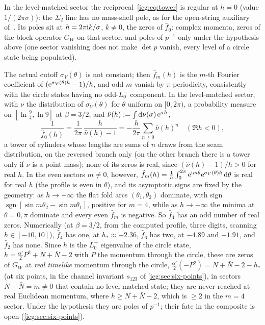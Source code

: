 In the level-matched sector the reciprocal~\eqref{icg:eq:tower} is regular at $h = 0$ (value $1/(2\pi\sigma)$): the $\Sigma_2$ line has no mass-shell pole, as for the open-string auxiliary of~\cite{ErbinFirat2023}.
Its poles sit at $h = 2\pi \mathrm{i} k / \sigma$, $k \neq 0$, the zeros of $\hat f_0$: complex momenta, zeros of the block operator $G_W$ on that sector, and poles of $p^{-1}$ only under the hypothesis above (one sector vanishing does not make $\det p$ vanish, every level of a circle state being populated).

The actual cutoff $\sigma_V(\theta)$ is not constant; then $\hat f_m(h)$ is the $m$-th Fourier coefficient of $(\mathrm{e}^{\sigma_V(\theta) h} - 1)/h$, and odd $m$ vanish by $\pi$-periodicity, consistently with the circle states having no odd-$L_0^-$ component.
In the level-matched sector, with $\nu$ the distribution of $\sigma_V(\theta)$ for $\theta$ uniform on $[0, 2\pi)$, a probability measure on $[\ln\tfrac94, \ln 9]$ at $\beta = 3/2$, and $\hat\nu(h) := \int \mathrm{d}\nu(\sigma) \, \mathrm{e}^{\sigma h}$,
\begin{equation}
  \label{icg:eq:tower-sigmaV}
  \frac{1}{\hat f_0(h)}
    = \frac{1}{2\pi} \, \frac{h}{\hat\nu(h) - 1}
    = - \frac{h}{2\pi} \sum_{n \ge 0} \hat\nu(h)^n
  \quad (\Re h < 0),
\end{equation}
a tower of cylinders whose lengths are sums of $n$ draws from the seam distribution, on the reversed branch only (on the other branch there is a tower only if $\nu$ is a point mass); none of its zeros is real, since $(\hat\nu(h) - 1)/h > 0$ for real $h$.
In the even sectors $m \neq 0$, however, $\hat f_m(h) = \frac1h \int_0^{2\pi} \mathrm{e}^{\mathrm{i} m\theta} \mathrm{e}^{\sigma_V(\theta) h} \, \mathrm{d}\theta$ is real for real $h$ (the profile is even in $\theta$), and its asymptotic signs are fixed by the geometry: as $h \to +\infty$ the flat fold arcs $(\theta_1, \theta_2)$ dominate, with sign $\operatorname{sgn}[\sin m\theta_2 - \sin m\theta_1]$, positive for $m = 4$, while as $h \to -\infty$ the minima at $\theta = 0, \pi$ dominate and every even $\hat f_m$ is negative.
So $\hat f_4$ has an odd number of real zeros.
Numerically (at $\beta = 3/2$, from the computed profile, three digits, scanning $h \in [-10, 10]$), $\hat f_4$ has one, at $h_* \approx -2.36$, $\hat f_6$ has two, at $-4.89$ and $-1.91$, and $\hat f_2$ has none.
Since $h$ is the $L_0^+$ eigenvalue of the circle state, $h = \tfrac{\alpha'}{2} P^2 + N + \bar N - 2$ with $P$ the momentum through the circle, these are zeros of $G_W$ at \emph{real timelike} momentum through the circle, $\tfrac{\alpha'}{2} (-P^2) = N + \bar N - 2 - h_*$ (at six points, in the channel invariant $s_{123}$ of \cref{icg:sec:six-points}), in sectors $N - \bar N = m \neq 0$ that contain no level-matched state; they are never reached at real Euclidean momentum, where $h \ge N + \bar N - 2$, which is $\ge 2$ in the $m = 4$ sector.
Under the hypothesis they are poles of $p^{-1}$; their fate in the composite is open (\cref{icg:sec:six-points}).



